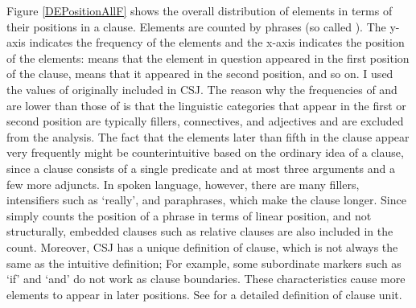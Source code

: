 Figure \ref{DEPositionAllF} shows the overall distribution of elements
in terms of their positions in a clause.
Elements are counted by phrases (so called ).
The y-axis indicates the frequency of the elements and
the x-axis indicates the position of the elements:
 means that the element in question appeared in the first position of the clause,
 means that it appeared in the second position,
and so on.
I used the values of  originally included in CSJ.
The reason why the frequencies of  and  are lower than those of  is that
the linguistic categories that appear in the first or second position
are typically fillers, connectives, and adjectives and are excluded from the analysis.
The fact that the elements later than fifth in the clause appear very frequently
might be counterintuitive based on the ordinary idea of a clause, since a clause consists of a single predicate and at most three arguments and a few more adjuncts.
In spoken language, however,
there are many fillers, intensifiers such as  `really', and paraphrases,
which make the clause longer.
Since  simply counts the position of a phrase in terms of linear position, and not structurally,
embedded clauses such as relative clauses are also included in the count.
Moreover,
CSJ has a unique definition of clause, which is not always the same as the intuitive definition;
For example,
some subordinate markers such as  `if' and  `and' do not work as clause boundaries.
These characteristics cause more elements to appear in later positions. See  for a detailed definition of clause unit.

